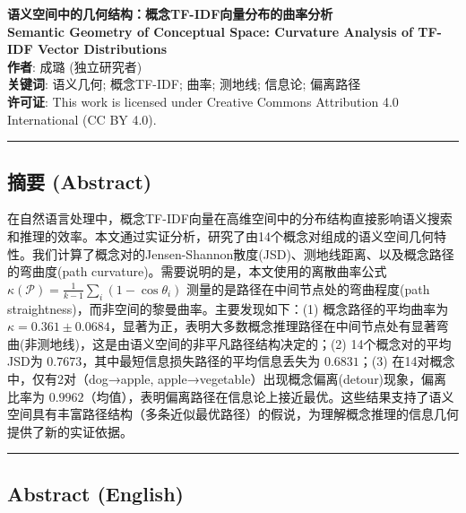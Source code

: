 \documentclass[UTF8,fontset=mac]{ctexart}
\title{}
\author{}
\date{}
\begin{document}
{\textbf{语义空间中的几何结构：概念TF-IDF向量分布的曲率分析}}\\
\textbf{Semantic Geometry of Conceptual Space: Curvature Analysis of TF-IDF Vector Distributions}\\
\textbf{作者}: 成璐 (独立研究者)\\
\textbf{关键词}: 语义几何; 概念TF-IDF; 曲率; 测地线; 信息论; 偏离路径\\
\textbf{许可证}: This work is licensed under Creative Commons Attribution 4.0 International (CC BY 4.0).

\begin{center}\rule{0.5\linewidth}{0.5pt}\end{center}

\subsection{摘要 (Abstract)}\label{abstract}

在自然语言处理中，概念TF-IDF向量在高维空间中的分布结构直接影响语义搜索和推理的效率。本文通过实证分析，研究了由14个概念对组成的语义空间几何特性。我们计算了概念对的Jensen-Shannon散度(JSD)、测地线距离、以及概念路径的弯曲度(path curvature)。需要说明的是，本文使用的离散曲率公式 \(\kappa(\mathcal{P}) = \frac{1}{k-1}\sum_i(1-\cos\theta_i)\) 测量的是路径在中间节点处的弯曲程度(path straightness)，而非空间的黎曼曲率。主要发现如下：(1) 概念路径的平均曲率为 \(\kappa = 0.361 \pm 0.0684\)，显著为正，表明大多数概念推理路径在中间节点处有显著弯曲(非测地线)，这是由语义空间的非平凡路径结构决定的；(2) 14个概念对的平均JSD为 \(0.7673\)，其中最短信息损失路径的平均信息丢失为 \(0.6831\)；(3) 在14对概念中，仅有2对（dog→apple, apple→vegetable）出现概念偏离(detour)现象，偏离比率为 \(0.9962\)（均值），表明偏离路径在信息论上接近最优。这些结果支持了语义空间具有丰富路径结构（多条近似最优路径）的假说，为理解概念推理的信息几何提供了新的实证依据。

\begin{center}\rule{0.5\linewidth}{0.5pt}\end{center}

\subsection*{Abstract (English)}\label{abstract-english}
\end{document}
